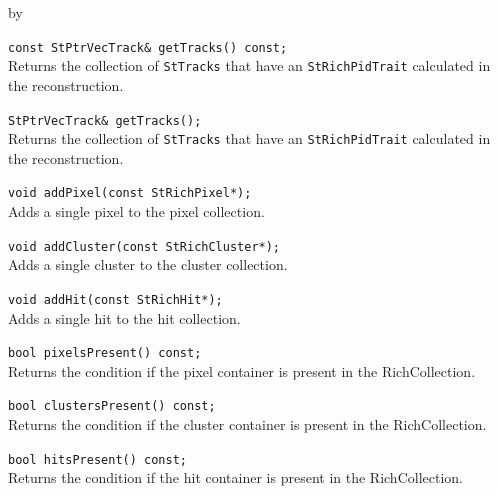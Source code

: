 \documentclass[twoside]{article}
\newcommand{\entrylabel}[1]{\mbox{\textbf{{#1}}}\hfil}%
\newenvironment{entry}
{\begin{list}{}%
    {\renewcommand{\makelabel}{\entrylabel}%
     \setlength{\labelwidth}{90pt}%
     \setlength{\leftmargin}{\labelwidth}
     \advance\leftmargin by \labelsep%
      }%
    }%
  {\end{list}}
\newcommand{\Entrylabel}[1]%
{\raisebox{0pt}[1ex][0pt]{\makebox[\labelwidth][l]%
    {\parbox[t]{\labelwidth}{\hspace{0pt}\textbf{{#1}}}}}}
\newenvironment{Entry}%
{\renewcommand{\entrylabel}{\Entrylabel}\begin{entry}}%
  {\end{entry}}
\begin{document}
\begin{Entry}
    \verb+const StPtrVecTrack& getTracks() const;+\\
    Returns the collection of \texttt{StTracks} that have an
    \texttt{StRichPidTrait} calculated in the reconstruction.

    \verb+StPtrVecTrack& getTracks();+\\
    Returns the collection of \texttt{StTracks} that have an
    \texttt{StRichPidTrait} calculated in the reconstruction.

    \verb+void addPixel(const StRichPixel*);+\\
    Adds a single pixel to the pixel collection.

    \verb+void addCluster(const StRichCluster*);+\\
    Adds a single cluster to the cluster collection.

    \verb+void addHit(const StRichHit*);+\\
    Adds a single hit to the hit collection.

    \verb+bool pixelsPresent() const;+\\
    Returns the condition if the pixel container
    is present in the RichCollection.

    \verb+bool clustersPresent() const;+\\
    Returns the condition if the cluster container
    is present in the RichCollection.

    \verb+bool hitsPresent() const;+\\
    Returns the condition if the hit container
    is present in the RichCollection.
\end{Entry}
\clearpage
\end{document}
